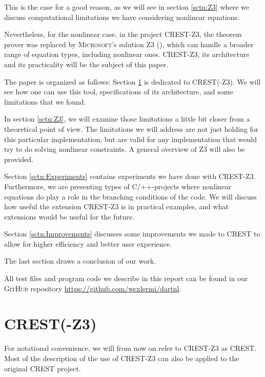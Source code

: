 \documentclass[oribibl]{llncs}
\begin{document}
This is the case for a good reason, as we will see in section \ref{sctn:Z3} where we discuss computational limitations we have considering nonlinear equations.

Nevertheless, for the nonlinear case, in the project \textsc{CREST-Z3}, the theorem prover was replaced
by \textsc{Microsoft'}s solution \textsc{Z3}
(\cite{de2008z3}), which can handle a broader range of equation types,
including nonlinear ones. \textsc{CREST-Z3}, its architecture and
its practicality will be the subject of this paper.

The paper is organized as follows: Section \ref{sctn:CRESTZ3} is
dedicated to \textsc{CREST}(-\textsc{Z3}). We will see how one can use
this tool, specifications of its architecture, and some limitations
that we found.

In section \ref{sctn:Z3}, we will examine those limitations a little
bit closer from a theoretical point of view. The limitations we will address are not just holding for this particular implementation, but are valid for any implementation that would try to do solving nonlinear constraints. A general overview of
\textsc{Z3} will also be provided.

Section \ref{sctn:Experiments} contains experiments we have done with
\textsc{CREST-Z3}. Furthermore, we are presenting types of \textsc{C/++}-projects
where nonlinear equations do play a role in the branching conditions
of the code. We will discuss how useful the extension \textsc{CREST-Z3} is in practical examples, and what extensions would be useful for the future.

Section \ref{sctn:Improvements} discusses some improvements we made to CREST to allow for higher efficiency
and better user experience.

The last section draws a conclusion of our work.

All test files and program code we describe in this report can be found in our \textsc{GitHub} repository \url{https://github.com/wexlermi/dartnl}.


\section{\textsc{CREST}(-\textsc{Z3})}
\label{sctn:CRESTZ3}

For notational convenience, we will from now on refer to
\textsc{CREST-Z3} as \textsc{CREST}. Most of the description of the
use of \textsc{CREST-Z3} can also be applied to the original
\textsc{CREST} project.
\end{document}
